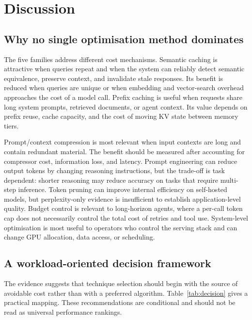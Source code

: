 \IfFileExists{jair.cls}{\documentclass{jair}}{\documentclass[manuscript,nonacm,screen]{acmart}}
\begin{document}
\section{Discussion}

\subsection{Why no single optimisation method dominates}

The five families address different cost mechanisms. Semantic caching is attractive when queries repeat and when the system can reliably detect semantic equivalence, preserve context, and invalidate stale responses. Its benefit is reduced when queries are unique or when embedding and vector-search overhead approaches the cost of a model call. Prefix caching is useful when requests share long system prompts, retrieved documents, or agent context. Its value depends on prefix reuse, cache capacity, and the cost of moving KV state between memory tiers.

Prompt/context compression is most relevant when input contexts are long and contain redundant material. The benefit should be measured after accounting for compressor cost, information loss, and latency. Prompt engineering can reduce output tokens by changing reasoning instructions, but the trade-off is task dependent: shorter reasoning may reduce accuracy on tasks that require multi-step inference. Token pruning can improve internal efficiency on self-hosted models, but perplexity-only evidence is insufficient to establish application-level quality. Budget control is relevant to long-horizon agents, where a per-call token cap does not necessarily control the total cost of retries and tool use. System-level optimisation is most useful to operators who control the serving stack and can change GPU allocation, data access, or scheduling.

\subsection{A workload-oriented decision framework}

The evidence suggests that technique selection should begin with the source of avoidable cost rather than with a preferred algorithm. Table~\ref{tab:decision} gives a practical mapping. These recommendations are conditional and should not be read as universal performance rankings.
\end{document}
